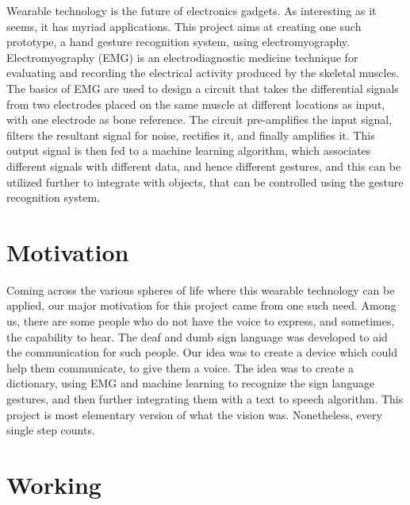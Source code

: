 \documentclass{article}
\begin{document}
Wearable technology is the future of electronics gadgets. As interesting as it seems, it has myriad applications. This project aims at creating one such prototype, a hand gesture recognition system, using electromyography.
Electromyography (EMG) is an electrodiagnostic medicine technique for evaluating and recording the electrical activity produced by the skeletal muscles. The basics of EMG are used to design a circuit that takes the differential signals from two electrodes placed on the same muscle at different locations as input, with one electrode as bone reference. 
The circuit pre-amplifies the input signal, filters the resultant signal for noise, rectifies it, and finally amplifies it. This output signal is then fed to a machine learning algorithm, which associates different signals with different data, and hence different gestures, and this can be utilized further to integrate with objects, that can be controlled using the gesture recognition system.

\section{Motivation}
Coming across the various spheres of life where this wearable technology can be applied, our major motivation for this project came from one such need. Among us, there are some people who do not have the voice to express, and sometimes, the capability to hear. The deaf and dumb sign language was developed to aid the communication for such people. Our idea was to create a device which could help them communicate, to give them a voice. The idea was to create a dictionary, using EMG and machine learning to recognize the sign language gestures, and then further integrating them with a text to speech algorithm. 
This project is most elementary version of what the vision was. Nonetheless, every single step counts.

\section{Working}
\end{document}
